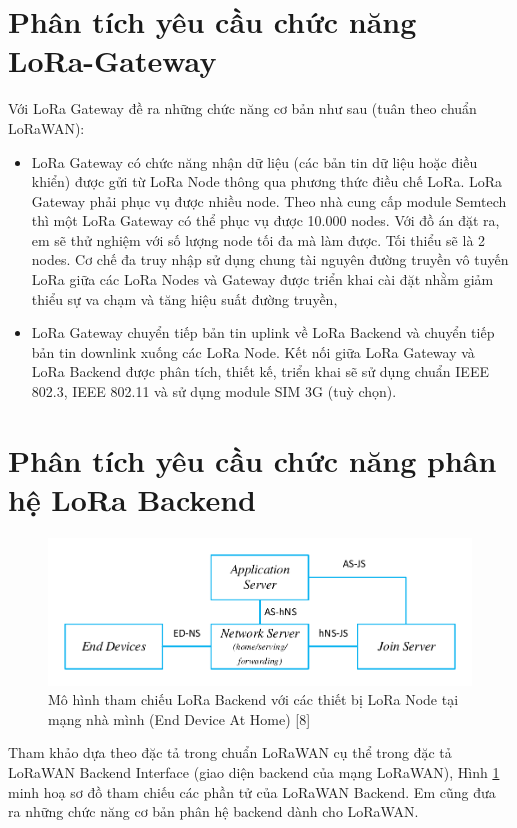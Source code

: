 \section{Phân tích yêu cầu chức năng LoRa-Gateway}
Với LoRa Gateway đề ra những chức năng cơ bản như sau (tuân theo chuẩn LoRaWAN):
\begin{itemize}
\item	LoRa Gateway có chức năng nhận dữ liệu (các bản tin dữ liệu hoặc điều khiển) được gửi từ LoRa Node thông qua phương thức điều chế LoRa. LoRa Gateway phải phục vụ được nhiều node. Theo nhà cung cấp module Semtech thì một LoRa Gateway có thể phục vụ được 10.000 nodes. Với đồ án đặt ra, em sẽ thử nghiệm với số lượng node tối đa mà làm được. Tối thiểu sẽ là 2 nodes. Cơ chế đa truy nhập sử dụng chung tài nguyên đường truyền vô tuyến LoRa giữa các LoRa Nodes và Gateway được triển khai cài đặt nhằm giảm thiểu sự va chạm và tăng hiệu suất đường truyền,
\item	LoRa Gateway chuyển tiếp bản tin uplink về LoRa Backend và chuyển tiếp bản tin downlink xuống các LoRa Node. Kết nối giữa LoRa Gateway và LoRa Backend được phân tích, thiết kế, triển khai sẽ sử dụng chuẩn IEEE 802.3, IEEE 802.11 và sử dụng module SIM 3G (tuỳ chọn).
\end{itemize}
\section{Phân tích yêu cầu chức năng phân hệ LoRa Backend }
	\begin{figure}[h!] %
			\centering
			\includegraphics[width=\linewidth]{./img/32.pdf}
			\caption{Mô hình tham chiếu LoRa Backend với các thiết bị LoRa Node tại mạng nhà mình (End Device At Home) [8]}
			\label{fig:fig32}
	\end{figure}
Tham khảo dựa theo đặc tả trong chuẩn LoRaWAN cụ thể trong đặc tả LoRaWAN Backend Interface (giao diện backend của mạng LoRaWAN), Hình \ref{fig:fig32} minh hoạ sơ đồ tham chiếu các phần tử của LoRaWAN Backend. Em cũng đưa ra những chức năng cơ bản phân hệ backend dành cho LoRaWAN.

